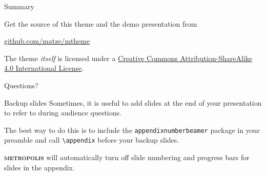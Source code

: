 \documentclass[10pt]{beamer}
\newcommand{\themename}{\textbf{\textsc{metropolis}}\xspace}
\begin{document}


\begin{frame}{Summary}

  Get the source of this theme and the demo presentation from

  \begin{center}\url{github.com/matze/mtheme}\end{center}

  The theme \emph{itself} is licensed under a
  \href{http://creativecommons.org/licenses/by-sa/4.0/}{Creative Commons
  Attribution-ShareAlike 4.0 International License}.


\end{frame}

\begin{frame}[standout]
  Questions?
\end{frame}

\appendix

\begin{frame}[fragile]{Backup slides}
  Sometimes, it is useful to add slides at the end of your presentation to
  refer to during audience questions.

  The best way to do this is to include the \verb|appendixnumberbeamer|
  package in your preamble and call \verb|\appendix| before your backup slides.

  \themename will automatically turn off slide numbering and progress bars for
  slides in the appendix.
\end{frame}
\fi

%  
%  

\end{document}
